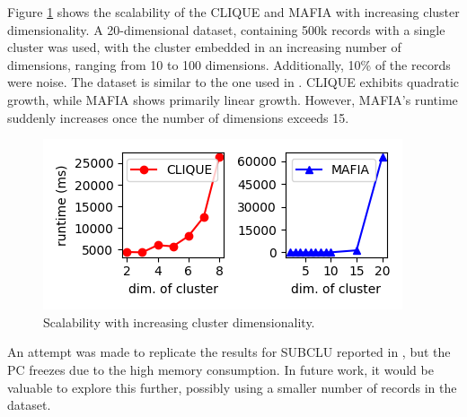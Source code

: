 Figure \ref{fig:cluster_dimensionality_vs_runtime} shows the scalability of the CLIQUE and MAFIA with increasing cluster dimensionality. A 20-dimensional dataset, containing 500k records with a single cluster was used, with the cluster embedded in an increasing number of dimensions, ranging from 10 to 100 dimensions. Additionally, 10\% of the records were noise. The dataset is similar to the one used in \cite{mafia}. CLIQUE exhibits quadratic growth, while MAFIA shows primarily linear growth. However, MAFIA's runtime suddenly increases once the number of dimensions exceeds 15.
\begin{figure}[H]
    \vspace*{-0.6cm}
    \centering
    \includegraphics[scale=0.5]{figures/cluster_dimensionality_vs_runtime.png}
    \caption{Scalability with increasing cluster dimensionality.}
    \label{fig:cluster_dimensionality_vs_runtime}
    \vspace*{-0.6cm}
\end{figure}

An attempt was made to replicate the results for SUBCLU reported in \cite{subclu}, but the PC freezes due to the high memory consumption. In future work, it would be valuable to explore this further, possibly using a smaller number of records in the dataset.


